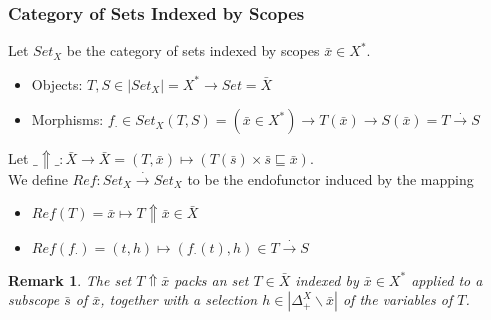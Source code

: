 \documentclass[aspectratio=169]{beamer}
\theoremstyle{remarkstyle}
\newtheorem*{remark}{Remark}
\begin{document}
\begin{frame}[fragile]
  \frametitle{Category of Sets Indexed by Scopes}
  \begin{definition}
    Let $Set_X$ be the category of sets indexed by scopes $\bar{x} ∈ X^*$.
    \begin{itemize}
      \item Objects: $T, S ∈ |Set_X| = X^* → Set = \bar{X}$
      \item Morphisms: $f_⋅ ∈ Set_X(T, S) = (\bar{x}∈X^*) → T(\bar{x}) → S(\bar{x}) = T \stackrel{⋅}{→} S$
    \end{itemize}
  \end{definition}
  \begin{definition}
    Let $\_⇑\_ : \bar{X} → \bar{X} = (T, \bar{x}) ↦ (T(\bar{s}) × \bar{s} ⊑ \bar{x})$.\\
    We define $Ref : Set_X \stackrel{⋅}{→} Set_X$ to be the endofunctor induced by the mapping
    \begin{itemize}
      \item $Ref(T) = \bar{x} ↦ T ⇑ \bar{x} ∈ \bar{X}$
      \item{$Ref(f_⋅) = (t, h) ↦ (f_⋅(t) , h) ∈ T \stackrel{⋅}{→} S$}
    \end{itemize}
  \end{definition}
  \begin{remark}
    The set $T⇑\bar{x}$ packs an set $T ∈ \bar{X}$ indexed by $\bar{x} ∈ X^*$ applied to a subscope $\bar{s}$ of $\bar{x}$, together with a selection $h ∈ |Δ_+^X∖\bar{x}|$ of the variables of $T$.
  \end{remark}
\end{frame}


\end{document}
